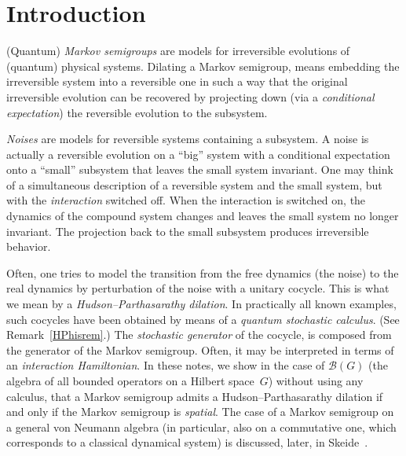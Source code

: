 \documentclass[pdftex]{sigma}%
\newcommand{\eus}[1]{\mathscr{#1}}
\newcommand{\sB}{\eus{B}}
\numberwithin{equation}{section}
\begin{document}


\renewcommand{\thefootnote}{\arabic{footnote}}
\setcounter{footnote}{0}

\section{Introduction}

(Quantum) {\it Markov semigroups} are models for irreversible evolutions of (quantum) physical systems. Dilating a Markov semigroup, means embedding the irreversible system into a reversible one in such a way that the original irreversible evolution can be recovered by projecting down (via a {\it conditional expectation}) the reversible evolution to the subsystem.

{\it Noises} are models for reversible systems containing a subsystem. A noise is actually a reversible evolution on a ``big'' system with a conditional expectation onto a ``small'' subsystem that leaves the small system invariant. One may think of a simultaneous description of a reversible system and the small system, but with the {\it interaction} switched off. When the interaction is switched on, the dynamics of the compound system changes and leaves the small system no longer invariant. The projection back to the small subsystem produces irreversible behavior.

Often, one tries to model the transition from the free dynamics (the noise) to the real dynamics by perturbation of the noise with a unitary cocycle. This is what we mean by a {\it Hudson--Parthasarathy dilation}. In practically all known examples, such cocycles have been obtained by means of a {\it quantum stochastic calculus}. (See Remark~\ref{HPhisrem}.) The {\it stochastic generator} of the cocycle, is composed from the generator of the Markov semigroup. Often, it may be interpreted in terms of an {\it interaction Hamiltonian}. In these notes, we show in the case of $\sB(G)$ (the algebra of all bounded operators on a Hilbert space~$G$) without using any calculus, that a Markov semigroup admits a Hudson--Parthasarathy dilation if and only if the Markov semigroup is {\it spatial}. The case of a Markov semigroup on a general von Neumann algebra (in particular, also on a commutative one, which corresponds to a classical dynamical system) is discussed, later, in Skeide~\cite{Ske16}.
\end{document}
